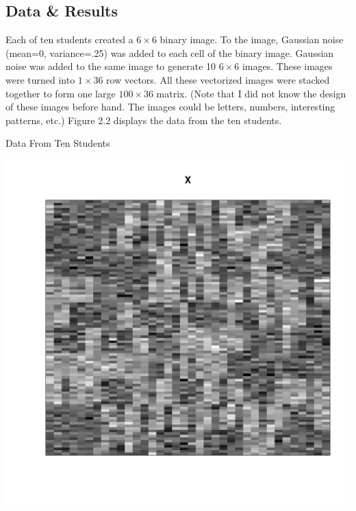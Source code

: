 \subsection{Data \& Results}
Each of ten students created a $6 \times 6$ binary image. To the
image, Gaussian noise (mean=0, variance=.25) was added to each cell of the
binary image. Gaussian noise was added to the same image to generate 10 $6
\times 6$ images. These images were turned into $1 \times 36$ row vectors. All
these vectorized images were stacked together to form one large $100 \times 36$
matrix. (Note that I did not know the design of these images before hand. The
images could be letters, numbers, interesting patterns, etc.)
Figure 2.2 displays the data from the ten students.\\

\beginmyfig
  \vspace{-5mm}
  \caption{Data From Ten Students}
  \vspace{-2mm}
  \includegraphics{images/Y.pdf}
  \vspace{-15mm}
\endmyfig

